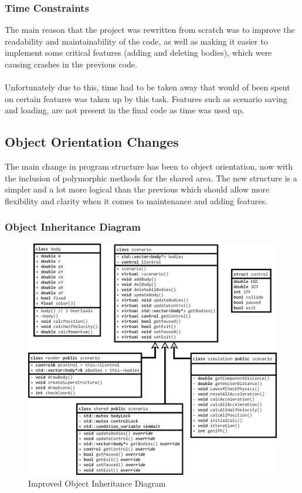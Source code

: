 \subsubsection{Time Constraints}
The main reason that the project was rewritten from scratch was to improve the readability and maintainability of the code, as well as making it easier to implement some critical features (adding and deleting bodies), which were causing crashes in the previous code.

\paragraph{}
Unfortunately due to this, time had to be taken away that would of been spent on certain features was taken up by this task. Features such as scenario saving and loading, are not present in the final code as time was used up.

\subsection{Object Orientation Changes}
The main change in program structure has been to object orientation, now with the inclusion of polymorphic methods for the shared area. The new structure is a simpler and a lot more logical than the previous which should allow more flexibility and clarity when it comes to maintenance and adding features.

\pagebreak
\subsubsection{Object Inheritance Diagram}
\begin{figure}[!ht]
  \centering
  \includegraphics[width=\textwidth]{img/didredo.png}
  \caption{Improved Object Inheritance Diagram}
\end{figure}

